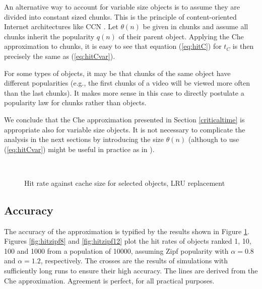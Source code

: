 \documentclass{amsart}
\begin{document}
An alternative way to account for variable size objects is to assume they are divided into constant sized chunks. This is the principle of content-oriented Internet architectures like CCN \cite{JSTP09}. Let $\theta(n)$ be given in chunks and assume all chunks inherit the popularity $q(n)$ of their parent object. Applying the Che approximation to chunks, it is easy to see that equation (\ref{eq:hitC}) for $t_C$ is then precisely the same as (\ref{eq:hitCvar}).

For some types of objects, it may be that chunks of the same object have different popularities (e.g., the first chunks of a video will be viewed more often than the last chunks). It makes more sense in this case to directly postulate a popularity law for chunks rather than objects. 

We conclude that the Che approximation presented in Section \ref{criticaltime} is appropriate also for variable size objects. It is not necessary to complicate the analysis in the next sections by introducing the size $\theta(n)$ (although to use (\ref{eq:hitCvar}) might be useful in practice as in \cite{FRRS12}). 

 
\begin{figure}
  \centering
\  \vspace{-3mm}\hspace{-2cm}
 \\
   \caption{Hit rate against cache size for selected objects, LRU replacement}
  \label{fig:approx}
  \vspace{-3mm}
\end{figure}

\subsection{Accuracy}
The accuracy of the approximation is typified by the results shown in Figure \ref{fig:approx}.  Figures \ref{fig:hitzipf8} and \ref{fig:hitzipf12} plot the hit rates of objects ranked 1, 10, 100 and 1000 from a population of 10000, assuming Zipf popularity with $\alpha=0.8$ and $\alpha=1.2$, respectively.  The crosses are the results of simulations with sufficiently long runs to ensure their high accuracy. The lines are derived from the Che approximation. Agreement is perfect, for all practical purposes.  
\end{document}
